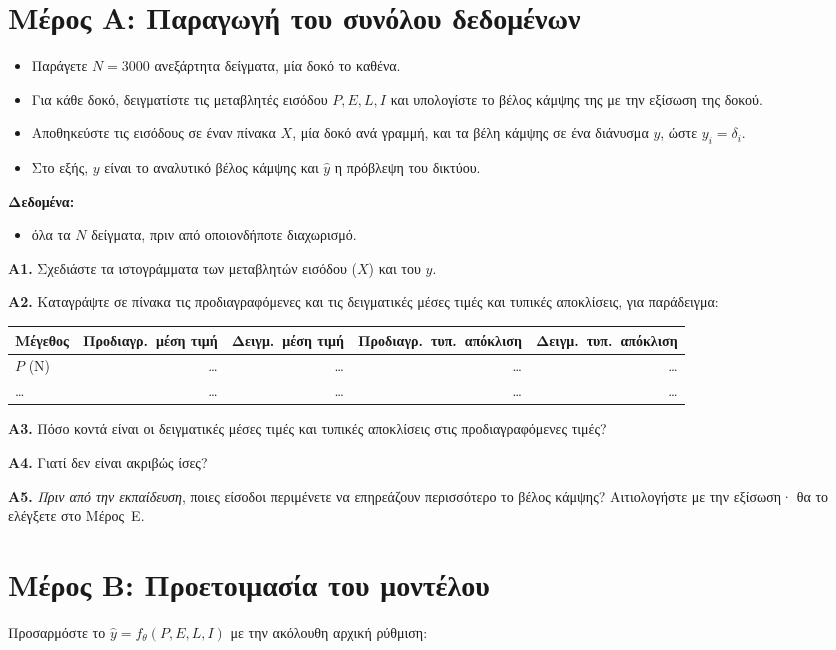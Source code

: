 \documentclass[11pt]{article}
\newcommand{\question}[2]{\par\noindent\textbf{#1.} #2\par}
\newcommand{\datause}[1]{\par\smallskip\needspace{4\baselineskip}\noindent\textbf{Δεδομένα:}\nopagebreak\begin{itemize}#1\end{itemize}}
\newcommand{\unit}[1]{\textlatin{#1}}
\begin{document}
\section*{Μέρος Α: Παραγωγή του συνόλου δεδομένων}
\begin{itemize}
  \item \aitrap Παράγετε $N=3000$ ανεξάρτητα δείγματα, μία δοκό το καθένα.
  \item Για κάθε δοκό, δειγματίστε τις μεταβλητές εισόδου $P,E,L,I$ και υπολογίστε το βέλος κάμψης της με την εξίσωση της δοκού.
  \item Αποθηκεύστε τις εισόδους σε έναν πίνακα $X$, μία δοκό ανά γραμμή, και τα βέλη κάμψης σε ένα διάνυσμα $y$, ώστε $y_i=\delta_i$.
  \item Στο εξής, $y$ είναι το αναλυτικό βέλος κάμψης και $\hat y$ η πρόβλεψη του δικτύου.
\end{itemize}
\datause{\item όλα τα $N$ δείγματα, πριν από οποιονδήποτε διαχωρισμό.}

\question{Α1}{Σχεδιάστε τα ιστογράμματα των μεταβλητών εισόδου ($X$) και του $y$.}
\question{Α2}{Καταγράψτε σε πίνακα τις προδιαγραφόμενες και τις δειγματικές μέσες τιμές και τυπικές αποκλίσεις, για παράδειγμα:}
\begin{center}
\small
\begin{tabular}{@{}lrrrr@{}}
\toprule
Μέγεθος & Προδιαγρ.\ μέση τιμή & Δειγμ.\ μέση τιμή & Προδιαγρ.\ τυπ.\ απόκλιση & Δειγμ.\ τυπ.\ απόκλιση \\
\midrule
$P$ (\unit{N}) & \dots & \dots & \dots & \dots \\
\dots & \dots & \dots & \dots & \dots \\
\bottomrule
\end{tabular}
\end{center}

\question{Α3}{Πόσο κοντά είναι οι δειγματικές μέσες τιμές και τυπικές αποκλίσεις στις προδιαγραφόμενες τιμές?}
\question{Α4}{Γιατί δεν είναι ακριβώς ίσες?}
\question{Α5}{\emph{Πριν από την εκπαίδευση}, ποιες είσοδοι περιμένετε να επηρεάζουν περισσότερο το βέλος κάμψης? Αιτιολογήστε με την εξίσωση· θα το ελέγξετε στο Μέρος~Ε.}

\section*{Μέρος Β: Προετοιμασία του μοντέλου}
\aitrap Προσαρμόστε το $\hat y=f_\theta(P,E,L,I)$ με την ακόλουθη αρχική ρύθμιση:
\end{document}
